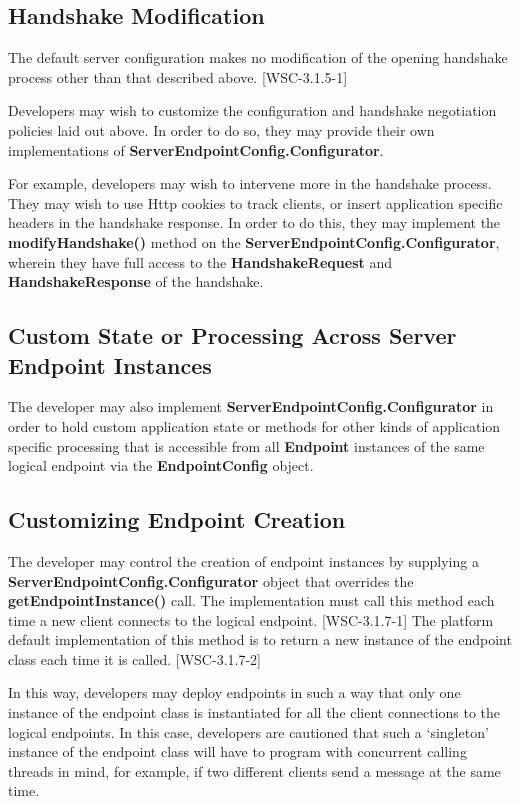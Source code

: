 \subsection{Handshake Modification}

The default server configuration makes no modification of the opening handshake process other than that described above. [WSC-3.1.5-1]

Developers may wish to customize the configuration and handshake negotiation policies laid out above. In order to do so, they may provide their own implementations of \textbf{ServerEndpointConfig.Configurator}.

For example, developers may wish to intervene more in the handshake process. They may wish to use Http cookies to track clients, or insert application specific headers in the handshake response. In order to do this, they may implement the \textbf{modifyHandshake()} method on the \textbf{ServerEndpointConfig.Configurator}, wherein they have full access to the \textbf{HandshakeRequest} and \textbf{HandshakeResponse} of the handshake.

\subsection{Custom State or Processing Across Server Endpoint Instances}

The developer may also implement \textbf{ServerEndpointConfig.Configurator} in order to hold custom application state or methods for other kinds of application specific processing that is accessible from all \textbf{Endpoint} instances of the same logical endpoint via the \textbf{EndpointConfig} object.

\subsection{Customizing Endpoint Creation}
\label{configuration:creation}

The developer may control the creation of endpoint instances by supplying a \textbf{ServerEndpointConfig.Configurator} object that overrides the \textbf{getEndpointInstance()} call. The implementation must call this method each time a new client connects to the logical endpoint. [WSC-3.1.7-1] The platform default implementation of this method is to return a new instance of the endpoint class each time it is called. [WSC-3.1.7-2]

In this way, developers may deploy endpoints in such a way that only one instance of the endpoint class is instantiated for all the client connections to the logical endpoints. In this case, developers are cautioned that such a ‘singleton’ instance of the endpoint class will have to program with concurrent calling threads in mind, for example, if two different clients send a message at the same time.

